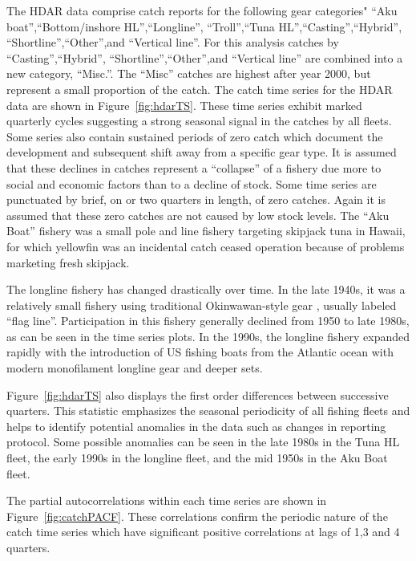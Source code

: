 \documentclass[12pt,letterpaper]{article}
\newcommand\help[1]{\color{Magenta}{\it #1 }\normalcolor}
\begin{document}
The HDAR data comprise catch reports for the following gear
categories"
``Aku boat'',``Bottom/inshore HL'',``Longline'',
``Troll'',``Tuna HL'',``Casting'',``Hybrid'',
``Shortline'',``Other'',and ``Vertical line''.
For this analysis catches by ``Casting'',``Hybrid'',
``Shortline'',``Other'',and ``Vertical line'' are combined into a new
category, ``Misc.''. The ``Misc'' catches are highest after year 2000,
but represent a small proportion of the catch.
The catch time series for the HDAR data are shown in
Figure~\ref{fig:hdarTS}. These time
series exhibit marked quarterly cycles suggesting a strong seasonal
signal in the catches by all fleets.
Some series also contain sustained periods of zero catch which
document the development and subsequent shift away from a specific
gear type. It is assumed that these declines in catches represent a
``collapse'' of a fishery due more to social and economic factors than
to a decline of stock.
Some time series are punctuated by brief, on or two quarters in
length, of zero catches. Again it is assumed that these zero catches
are not caused by low stock levels.
The ``Aku Boat'' fishery was a small pole and line fishery
targeting skipjack tuna in Hawaii, for which yellowfin was an
incidental catch ceased operation because of
problems marketing fresh skipjack.

The longline fishery has changed drastically over time. In the late
1940s, it was a relatively small fishery using traditional
Okinwawan-style gear \help{(reference)}, usually labeled ``flag
line''. Participation in this fishery generally declined from 1950 to
late 1980s, as can be seen in the time series plots. In the 1990s, the longline
fishery expanded rapidly with the introduction of US fishing boats
from the Atlantic ocean with modern monofilament longline gear and
deeper sets.

Figure~\ref{fig:hdarTS} also displays the first order differences
between successive quarters. This statistic emphasizes the seasonal
periodicity of all fishing fleets and helps to identify potential anomalies in
the data such as changes in reporting protocol. Some possible
anomalies can be seen in the late 1980s in the Tuna HL fleet, the
early 1990s in the longline fleet, and the mid 1950s in the Aku Boat
fleet. 

The partial autocorrelations within each time
series are shown in Figure~\ref{fig:catchPACF}. These correlations
confirm the periodic nature of the catch time series which have
significant positive correlations at lags of 1,3 and 4 quarters.
\end{document}
